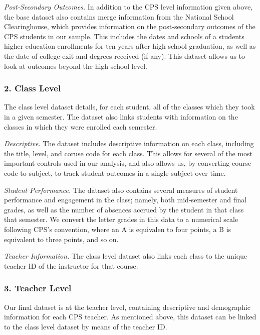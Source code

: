 \documentclass[../thesis_main.tex]{subfiles}
\begin{document}
\textit{Post-Secondary Outcomes.} In addition to the CPS level information given above, the base dataset also contains merge information from the National School Clearinghouse, which provides information on the post-secondary outcomes of the CPS students in our sample. This includes the dates and schools of a students higher education enrollments for ten years after high school graduation, as well as the date of college exit and degrees received (if any). This dataset allows us to look at outcomes beyond the high school level. 


\subsubsection{2. Class Level}

The class level dataset details, for each student, all of the classes which they took in a given semester. The dataset also links students with information on the classes in which they were enrolled each semester. 

\textit{Descriptive.} The dataset includes descriptive information on each class, including the title, level, and coruse code for each class. This allows for several of the most important controls used in our analysis, and also allows us, by converting course code to subject, to track student outcomes in a single subject over time. 

\textit{Student Performance.} The dataset also contains several measures of student performance and engagement in the class; namely, both mid-semester and final grades, as well as the number of absences accrued by the student in that class that semester. We convert the letter grades in this data to a numerical scale following CPS's convention, where an A is equivalen to four points, a B is equivalent to three points, and so on. 

\textit{Teacher Information.} The class level dataset also links each class to the unique teacher ID of the instructor for that course. 

\subsubsection{3. Teacher Level} 

Our final dataset is at the teacher level, containing descriptive and demographic information for each CPS teacher. As mentioned above, this dataset can be linked to the class level dataset by means of the teacher ID. 

\end{document}
